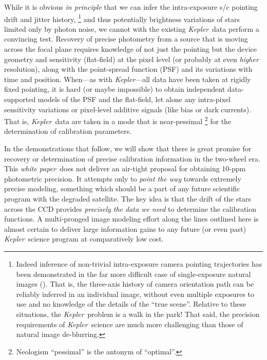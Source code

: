 \documentclass[letterpaper,12pt,whitepaper]{haastex}
\newcommand{\documentname}{\textsl{white paper}}
\newcommand{\observatory}[1]{\textsl{#1}}
\newcommand{\Kepler}{\observatory{Kepler}}
\begin{document}
While it is obvious \emph{in principle} that we can infer
  the intra-exposure s/c pointing drift and jitter history,%
  \footnote{Indeed inference of non-trivial intra-exposure
    camera pointing trajectories has been demonstrated in the far more difficult
    case of single-exposure natural images (\citealt{fergus2006,whyte2010,hirsch2011,koehler2012}).
  That is, the three-axis history of camera orientation path
    can be reliably inferred in an individual image,
    without even multiple exposures to use
    and no knowledge of the details of the ``true scene''.
  Relative to these situations, the \Kepler\ problem is a walk in the park!
  That said, the precision requirements of \Kepler\ science
    are much more challenging than those of natural image de-blurring.}
  and thus potentially brightness variations of stars limited only by photon noise,
  we cannot with the existing \Kepler\ data perform a convincing test.
Recovery of precise photometry from a source
  that is moving across the focal plane
  requires knowledge of not just the pointing but the device geometry and sensitivity
  (flat-field) at the pixel level (or probably at even \emph{higher} resolution),
  along with the point-spread function (PSF) and its variations with time and position.
When---as with \Kepler---all data have been taken at rigidly fixed pointing,
  it is hard (or maybe impossible) to obtain independent data-supported models of
  the PSF and the flat-field,
  let alone any intra-pixel sensitivity variations
  or pixel-level additive signals (like bias or dark currents).
That is,
  \Kepler\ data are taken in a mode that is
  near-pessimal%
  \footnote{Neologism ``pessimal'' is the antonym of ``optimal''.}
  for the determination of calibration parameters.

In the demonstrations that follow,
  we will show that there is great promise for recovery or determination of precise calibration information
  in the two-wheel era.
This \documentname\ does not deliver an air-tight proposal for obtaining 10-ppm photometric precision.
It attempts only to \emph{point the way} towards extremely precise modeling,
  something which should be a part of any future scientific program with the
  degraded satellite.
The key idea is that the drift of the stars across the CCD provides
  \emph{precisely the data we need} to determine the calibration functions.
A multi-pronged image modeling effort along the lines outlined here
  is almost certain to deliver large information gains to any future (or even past) \Kepler\ science program
  at comparatively low cost.
\end{document}
